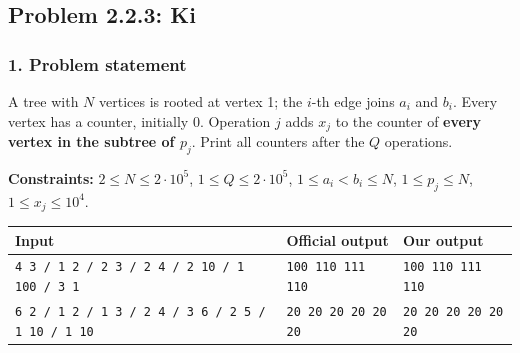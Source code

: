 \subsection{Problem 2.2.3: Ki}



\subsubsection*{1. Problem statement}

A tree with $N$ vertices is rooted at vertex 1; the $i$-th edge joins $a_i$ and $b_i$. Every vertex has a counter, initially 0. Operation $j$ adds $x_j$ to the counter of \textbf{every vertex in the subtree of $p_j$}. Print all counters after the $Q$ operations.

\textbf{Constraints:} $2 \le N \le 2\cdot10^5$, $1 \le Q \le 2\cdot10^5$, $1 \le a_i < b_i \le N$, $1 \le p_j \le N$, $1 \le x_j \le 10^4$.

\begin{table}[H]
\centering\small
\begin{tabular}{@{}lll@{}}
\toprule
\textbf{Input} & \textbf{Official output} & \textbf{Our output} \\
\midrule
\texttt{4 3 / 1 2 / 2 3 / 2 4 / 2 10 / 1 100 / 3 1} & \texttt{100 110 111 110} & \texttt{100 110 111 110} \\
\texttt{6 2 / 1 2 / 1 3 / 2 4 / 3 6 / 2 5 / 1 10 / 1 10} & \texttt{20 20 20 20 20 20} & \texttt{20 20 20 20 20 20} \\
\bottomrule
\end{tabular}
\end{table}

